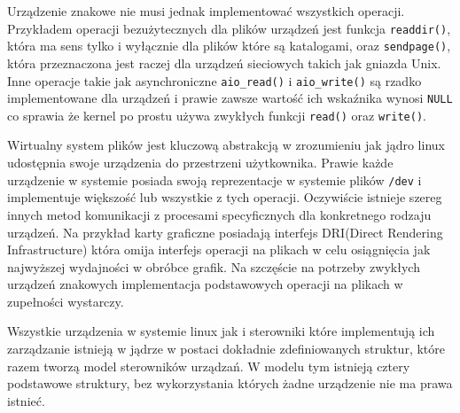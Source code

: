 Urządzenie znakowe nie musi jednak implementować wszystkich operacji.
Przykładem operacji bezużytecznych dla plików urządzeń jest funkcja
\texttt{readdir()}, która ma sens tylko i wyłącznie dla plików które są
katalogami, oraz \texttt{sendpage()}, która przeznaczona jest raczej dla
urządzeń sieciowych takich jak gniazda Unix. Inne operacje takie jak
asynchroniczne \texttt{aio\_read()} i \texttt{aio\_write()} są rzadko
implementowane dla urządzeń i prawie zawsze wartość ich wskaźnika wynosi
\texttt{NULL} co sprawia że kernel po prostu używa zwykłych funkcji
\texttt{read()} oraz \texttt{write()}.

Wirtualny system plików jest kluczową abstrakcją w zrozumieniu jak jądro
linux udostępnia swoje urządzenia do przestrzeni użytkownika. Prawie
każde urządzenie w systemie posiada swoją reprezentacje w systemie
plików \texttt{/dev} i implementuje większość lub wszystkie z tych
operacji. Oczywiście istnieje szereg innych metod komunikacji z
procesami specyficznych dla konkretnego rodzaju urządzeń. Na przykład
karty graficzne posiadają interfejs DRI(Direct Rendering Infrastructure)
która omija interfejs operacji na plikach w celu osiągnięcia jak
najwyższej wydajności w obróbce grafik. Na szczęście na potrzeby
zwykłych urządzeń znakowych implementacja podstawowych operacji na
plikach w zupełności wystarczy.


Wszystkie urządzenia w systemie linux jak i sterowniki które
implementują ich zarządzanie istnieją w jądrze w postaci dokładnie
zdefiniowanych struktur, które razem tworzą model sterowników urządzań.
W modelu tym istnieją cztery podstawowe struktury, bez wykorzystania
których żadne urządzenie nie ma prawa istnieć.


